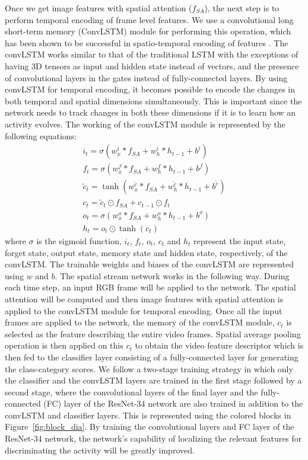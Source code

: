 \documentclass{bmvc2k}
\newcommand{\rev}[2]{#2}
\begin{document}
Once we get image features with spatial attention ($f_{SA}$), the next step is to perform temporal encoding of frame level features. We use a convolutional long short-term memory (ConvLSTM) module for performing this operation, which has been shown to be successful in spatio-temporal encoding of features \cite{medel2016anomaly} \cite{sudhakaran2017learning} \cite{Sudhakaran_2017_ICCV}. The convLSTM works similar to that of the traditional LSTM with the exceptions of having 3D tensors as input and hidden state instead of vectors, and the presence of convolutional layers in the gates instead of fully-connected layers. By using convLSTM for temporal encoding, it becomes possible to encode the changes in both temporal and spatial dimensions simultaneously. This is important since the network needs to track changes in both these dimensions if it is to learn how an activity evolves. The working of the convLSTM module is represented by the following equations:
\begin{eqnarray}
i_t = \sigma(w_x^i* f_{SA} + w_h^i*h_{t-1} + b^i)\\
f_t = \sigma(w_x^f* f_{SA} + w_h^f*h_{t-1} + b^f)\\
\tilde{c}_t = \tanh(w_x^{\tilde{c}}*f_{SA} + w_h^{\tilde{c}}*h_{t-1} + b^{\tilde{c}})\\
c_t = \tilde{c}_t\odot f_{SA} + c_{t-1}\odot f_t\\
o_t = \sigma(w_x^o * f_{SA} + w_h^o*h_{t-1} + b^o)\\
h_t = o_t\odot \tanh(c_t)
\label{eq:convLSTM}
\end{eqnarray}
\rev{}{where $\sigma$ is the sigmoid function, $i_t$, $f_t$, $o_t$, $c_t$ and $h_t$ represent the input state, forget state, output state, memory state and hidden state, respectively, of the convLSTM. The trainable weights and biases of the convLSTM are represented using $w$ and $b$.} The spatial stream network works in the following way. During each time step, an input RGB frame will be applied to the network. The spatial attention will be computed and then image features with spatial attention is applied to the convLSTM module for temporal encoding. Once all the input frames are applied to the network, the memory of the convLSTM module, $c_t$ is selected as the feature describing the entire video frames. Spatial average pooling operation is then applied on this $c_t$ to obtain the video feature descriptor which is then fed to the classifier layer consisting of a fully-connected layer for generating the class-category scores. We follow a two-stage training strategy in which only the classifier and the convLSTM layers are trained in the first stage followed by a second stage, where the convolutional layers of the final layer and the fully-connected (FC) layer of the ResNet-34 network are also trained in addition to the convLSTM and classifier layers. This is represented using the colored blocks in Figure~\ref{fig:block_dia}. By training the convolutional layers and FC layer of the ResNet-34 network, the network's capability of localizing the relevant features for discriminating the activity will be greatly improved.
\end{document}
